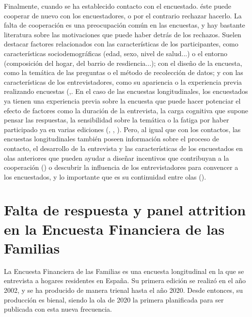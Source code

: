 Finalmente, cuando se ha establecido contacto con el encuestado. éste puede cooperar de nuevo con los encuestadores, o por el contrario rechazar hacerlo. La falta de cooperación es una preocupación común en las encuestas, y hay bastante literatura sobre las motivaciones que puede haber detrás de los rechazos. Suelen destacar factores relacionados con las características de los participantes, como características sociodemográficas (edad, sexo, nivel de salud...) o el entorno (composición del hogar, del barrio de resdiencia...); con el diseño de la encuesta, como la temática de las preguntas o el método de recolección de datos; y con las características de los entrevistadores, como su apariencia o la experiencia previa realizando encuestas (\cite{groves1992understanding},\cite{obrien2006sensitive}. En el caso de las encuestas longitudinales, los encuestados ya tienen una experiencia previa sobre la encuesta que puede hacer potenciar el efecto de factores como la duración de la entrevista, la carga cognitiva que supone pensar las respuestas, la sensibilidad sobre la temática o la fatiga por haber participado ya en varias ediciones (\cite{laurie1999strategies}, \cite{watson2009identifying}, \cite{lynn2018tackling}). Pero, al igual que con los contactos, las encuestas longitudinales también poseen información sobre el proceso de contacto, el desarrollo de la entrevista y las características de los encuestados en olas anteriores que pueden ayudar a diseñar incentivos que contribuyan a la cooperación (\cite{laurie2009use}) o descubrir la influencia de los entrevistadores para convencer a los encuestados, y lo importante que es su continuidad entre olas (\cite{lynn2014continuity}).

\section{Falta de respuesta y panel attrition en la Encuesta Financiera de las Familias}

La Encuesta Financiera de las Familias es una encuesta longitudinal en la que se entrevista a hogares residentes en España. Su primera edición se realizó en el año 2002, y se ha producido de manera trienal hasta el año 2020. Desde entonces, su producción es bienal, siendo la ola de 2020 la primera planificada para ser publicada con esta nueva frecuencia.

